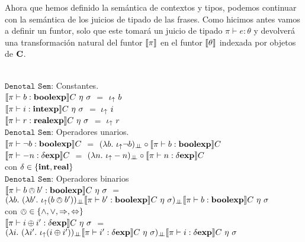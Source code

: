 Ahora que hemos definido la sem\'antica de contextos y tipos, podemos continuar con
la sem\'antica de los juicios de tipado de las frases. Como hicimos antes vamos a definir un 
funtor, solo que este tomar\'a un juicio de tipado $\pi \vdash e : \theta$ y 
devolver\'a una transformaci\'on natural del funtor $\llbracket \pi \rrbracket$ en el funtor $\llbracket \theta \rrbracket$ 
indexada por objetos de $\textbf{C}$.\\
\

\noindent
$\texttt{Denotal Sem:}$ Constantes.\\

$\llbracket  \pi \vdash b : \textbf{boolexp}  \rrbracket C \ \eta \ \sigma$ $=$ $\iota_{\uparrow} \ b$\\

$\llbracket  \pi \vdash i : \textbf{intexp}   \rrbracket C \ \eta \ \sigma$ $=$ $\iota_{\uparrow} \ i$\\

$\llbracket  \pi \vdash r : \textbf{realexp}  \rrbracket C \ \eta \ \sigma$ $=$ $\iota_{\uparrow} \ r$\\

\noindent
$\texttt{Denotal Sem:}$ Operadores unarios.\\

$\llbracket  \pi \vdash \neg b : \textbf{boolexp}  \rrbracket C$ 
$=$ 
$(\lambda b . \ \iota_{\uparrow} \neg b)_{\bot \!\!\! \bot} \circ \llbracket \pi \vdash b : \textbf{boolexp} \rrbracket C$\\

$\llbracket  \pi \vdash -n : \delta \textbf{exp}  \rrbracket C$ 
$=$ 
$(\lambda n . \ \iota_{\uparrow} -n)_{\bot \!\!\! \bot} \circ \llbracket \pi \vdash n : \delta \textbf{exp} \rrbracket C$\\

con $\delta \in \{ \textbf{int},\textbf{real} \}$\\

\noindent
$\texttt{Denotal Sem:}$ Operadores binarios\\

$\llbracket  \pi \vdash b \owedge b' : \textbf{boolexp}  \rrbracket C \ \eta \ \sigma$ 
$=$ \\
\indent \indent \indent
$(\lambda b . \ (\lambda b' . \ \iota_{\uparrow} (b \owedge b'))_{\bot \!\!\! \bot}
\llbracket \pi \vdash b' : \textbf{boolexp} \rrbracket C \ \eta \ \sigma)_{\bot \!\!\! \bot}
\llbracket \pi \vdash b : \textbf{boolexp} \rrbracket C \ \eta \ \sigma$\\

con $\owedge \in \{ \wedge,\vee,\Rightarrow,\Leftrightarrow \}$\\

$\llbracket  \pi \vdash i \oplus i' : \delta \textbf{exp}  \rrbracket C \ \eta \ \sigma$ 
$=$ \\
\indent \indent \indent
$(\lambda i . \ (\lambda i' . \ \iota_{\uparrow} (i \oplus i'))_{\bot \!\!\! \bot}
\llbracket \pi \vdash i' : \delta \textbf{exp} \rrbracket C \ \eta \ \sigma)_{\bot \!\!\! \bot}
\llbracket \pi \vdash i : \delta \textbf{exp} \rrbracket C \ \eta \ \sigma$\\

